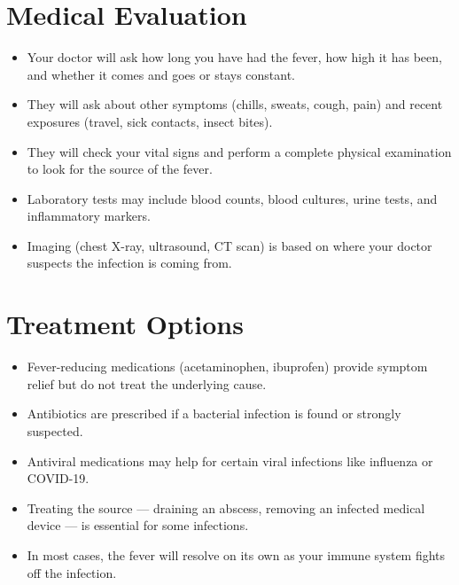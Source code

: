 \section*{Medical Evaluation}
\begin{itemize}
  \item Your doctor will ask how long you have had the fever, how high it has been, and whether it comes and goes or stays constant.
  \item They will ask about other symptoms (chills, sweats, cough, pain) and recent exposures (travel, sick contacts, insect bites).
  \item They will check your vital signs and perform a complete physical examination to look for the source of the fever.
  \item Laboratory tests may include blood counts, blood cultures, urine tests, and inflammatory markers.
  \item Imaging (chest X-ray, ultrasound, CT scan) is based on where your doctor suspects the infection is coming from.
\end{itemize}

\section*{Treatment Options}
\begin{itemize}
  \item Fever-reducing medications (acetaminophen, ibuprofen) provide symptom relief but do not treat the underlying cause.
  \item Antibiotics are prescribed if a bacterial infection is found or strongly suspected.
  \item Antiviral medications may help for certain viral infections like influenza or COVID-19.
  \item Treating the source — draining an abscess, removing an infected medical device — is essential for some infections.
  \item In most cases, the fever will resolve on its own as your immune system fights off the infection.
\end{itemize}


